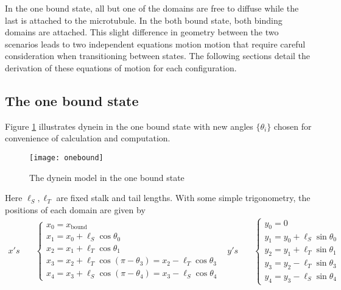 	In the one bound state, all but one of the domains are free to diffuse while the last is attached to the microtubule. In the both bound state, both binding domains are attached. This slight difference in geometry between the two scenarios leads to two independent equations motion motion that require careful consideration when transitioning between states. The following sections detail the derivation of these equations of motion for each configuration. 
	
		\subsection{The one bound state}
		Figure \ref{fig:one bound} illustrates dynein in the one bound state with new angles $\{\theta_i\}$ chosen for convenience of calculation and computation.\\
		\begin{figure}[!hbt]
			\centering
			\texttt{[image: onebound]}
			\caption{The dynein model in the one bound state }
			\label{fig:one bound}  
		\end{figure}
		
		\noindent Here $\ell_S, \ell_T$ are fixed stalk and tail lengths. With some simple trigonometry, the positions of each domain are given by
		\begin{align}
		x's \quad &\begin{cases}
		x_0 = x_\text{bound} \\
		x_1 = x_0 + \ell_S \cos\theta_0 \\
		x_2 = x_1 + \ell_T \cos\theta_1 \\
		x_3 = x_2 + \ell_T \cos(\pi-\theta_3) = x_2 - \ell_T\cos\theta_3 \\
		x_4 = x_3 + \ell_S \cos(\pi-\theta_4) = x_3 - \ell_S\cos\theta_4
		\end{cases} &
		y's \quad &\begin{cases}
		y_0 = 0 \\
		y_1 = y_0 + \ell_S\sin\theta_0 \\
		y_2 = y_1 + \ell_T\sin\theta_1 \\
		y_3 = y_2 - \ell_T\sin\theta_3 \\
		y_4 = y_3 - \ell_S\sin\theta_4 
		\end{cases}
		\end{align} 
		
